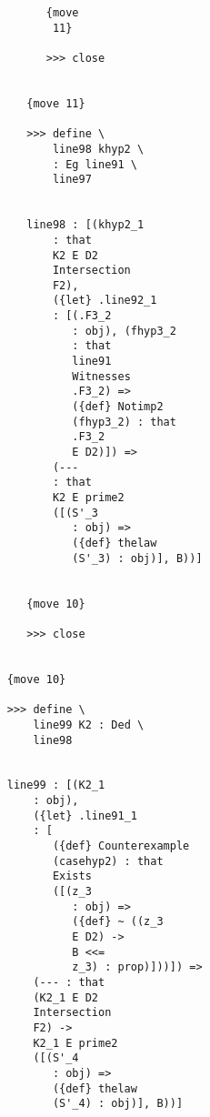 \documentclass[12pt]{article}
\begin{document}
\begin{verbatim}
                                    {move 
                                     11}

                                    >>> close


                                 {move 11}

                                 >>> define \
                                     line98 khyp2 \
                                     : Eg line91 \
                                     line97


                                 line98 : [(khyp2_1 
                                     : that 
                                     K2 E D2 
                                     Intersection 
                                     F2), 
                                     ({let} .line92_1 
                                     : [(.F3_2 
                                        : obj), (fhyp3_2 
                                        : that 
                                        line91 
                                        Witnesses 
                                        .F3_2) => 
                                        ({def} Notimp2 
                                        (fhyp3_2) : that 
                                        .F3_2 
                                        E D2)]) => 
                                     (--- 
                                     : that 
                                     K2 E prime2 
                                     ([(S'_3 
                                        : obj) => 
                                        ({def} thelaw 
                                        (S'_3) : obj)], B))]


                                 {move 10}

                                 >>> close


                              {move 10}

                              >>> define \
                                  line99 K2 : Ded \
                                  line98


                              line99 : [(K2_1 
                                  : obj), 
                                  ({let} .line91_1 
                                  : [
                                     ({def} Counterexample 
                                     (casehyp2) : that 
                                     Exists 
                                     ([(z_3 
                                        : obj) => 
                                        ({def} ~ ((z_3 
                                        E D2) -> 
                                        B <<= 
                                        z_3) : prop)]))]) => 
                                  (--- : that 
                                  (K2_1 E D2 
                                  Intersection 
                                  F2) -> 
                                  K2_1 E prime2 
                                  ([(S'_4 
                                     : obj) => 
                                     ({def} thelaw 
                                     (S'_4) : obj)], B))]



\end{verbatim}
\end{document}
